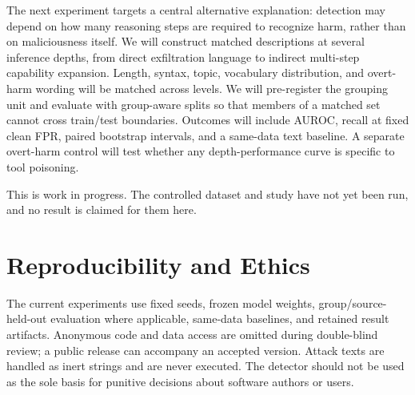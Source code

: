 \documentclass[10pt]{article}
\begin{document}
The next experiment targets a central alternative explanation: detection may depend on how many reasoning steps are required to recognize harm, rather than on maliciousness itself. We will construct matched descriptions at several inference depths, from direct exfiltration language to indirect multi-step capability expansion. Length, syntax, topic, vocabulary distribution, and overt-harm wording will be matched across levels. We will pre-register the grouping unit and evaluate with group-aware splits so that members of a matched set cannot cross train/test boundaries. Outcomes will include AUROC, recall at fixed clean FPR, paired bootstrap intervals, and a same-data text baseline. A separate overt-harm control will test whether any depth-performance curve is specific to tool poisoning.

This is work in progress. The controlled dataset and study have not yet been run, and no result is claimed for them here.

\section*{Reproducibility and Ethics}

The current experiments use fixed seeds, frozen model weights, group/source-held-out evaluation where applicable, same-data baselines, and retained result artifacts. Anonymous code and data access are omitted during double-blind review; a public release can accompany an accepted version. Attack texts are handled as inert strings and are never executed. The detector should not be used as the sole basis for punitive decisions about software authors or users.



\end{document}
